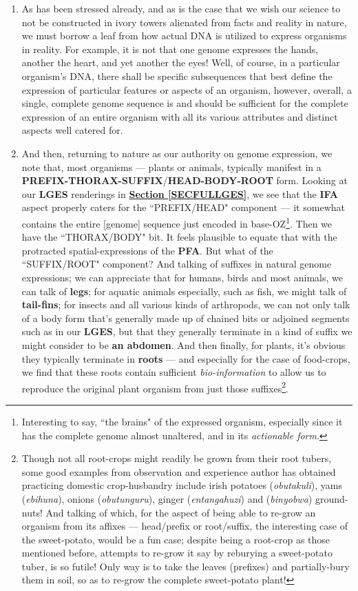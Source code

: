 \documentclass[a4paper, 18pt]{book} %
\begin{document}
\begin{enumerate}
\item As has been stressed already, and as is the case that we wish our science to not be constructed in ivory towers alienated from facts and reality in nature, we must borrow a leaf from how actual DNA is utilized to express organisms in reality. For example, it is not that one genome expresses the hands, another the heart, and yet another the eyes! Well, of course, in a particular organism's DNA, there shall be specific subsequences that best define the expression of particular features or aspects of an organism, however, overall, a single, complete genome sequence is and should be sufficient for the complete expression of an entire organism with all its various attributes and distinct aspects well catered for.

\item And then, returning to nature as our authority on genome expression, we note that, most organisms --- plants or animals, typically manifest in a \textbf{PREFIX-THORAX-SUFFIX}/\textbf{HEAD-BODY-ROOT} form. Looking at our \textbf{LGES} renderings in \textbf{\hyperref[SECFULLGES]{Section \ref{SECFULLGES}}}, we see that the \textbf{IFA} aspect properly caters for the ``PREFIX/HEAD" component --- it somewhat contains the entire [genome] sequence just encoded in base-OZ\footnote{Interesting to say, ``the brains" of the expressed organism, especially since it has the complete genome almost unaltered, and in its \textit{actionable form}.}. Then we have the ``THORAX/BODY" bit. It feels plausible to equate that with the protracted spatial-expressions of the \textbf{PFA}. But what of the ``SUFFIX/ROOT" component? And talking of suffixes in natural genome expressions; we can appreciate that for humans, birds and most animals, we can talk of \textbf{legs}; for aquatic animals especially, such as fish, we might talk of \textbf{tail-fins}; for insects and all various kinds of arthropods, we can not only talk of a body form that's generally made up of chained bits or adjoined segments such as in our \textbf{LGES}, but that they generally terminate in a kind of suffix we might consider to be \textbf{an abdomen}. And then finally, for plants, it's obvious they typically terminate in \textbf{roots} --- and especially for the case of food-crops, we find that these roots contain sufficient \textit{bio-information} to allow us to reproduce the original plant organism from just those suffixes\footnote{Though not all root-crops might readily be grown from their root tubers, some good examples from observation and experience author has obtained practicing domestic crop-husbandry include irish potatoes (\textit{obutakuli}), yams (\textit{ebihuna}), onions (\textit{obutunguru}), ginger (\textit{entangahuzi}) and (\textit{binyobwa}) ground-nuts! And talking of which, for the aspect of being able to re-grow an organism from its affixes --- head/prefix or root/suffix, the interesting case of the sweet-potato, would be a fun case; despite being a root-crop as those mentioned before, attempts to re-grow it say by reburying a sweet-potato tuber, is so futile! Only way is to take the leaves (prefixes) and partially-bury them in soil, so as to re-grow the complete sweet-potato plant!}.
\end{enumerate}
\end{document}
